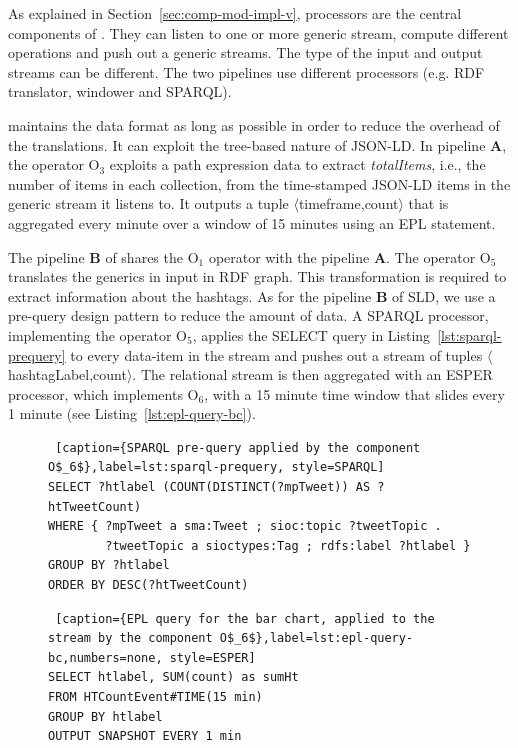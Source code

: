 {As explained in Section~\ref{sec:comp-mod-impl-v}, processors are the central components of \sti{}. They can listen to one or more generic stream, compute different operations and push out a generic streams. The type of the input and output streams can be different. The two pipelines use different processors (e.g. RDF translator, windower and SPARQL).

\sti{} maintains the data format as long as possible in order to reduce the overhead of the translations. It can exploit the tree-based nature of JSON-LD. In pipeline \textbf{A}, the operator O$_3$ exploits a path expression data to extract \textit{totalItems}, i.e., the number of items in each collection, from the time-stamped JSON-LD items in the generic stream it listens to. It outputs a tuple $\langle$timeframe,count$\rangle$ that is aggregated every minute over a window of 15 minutes using an EPL statement.

The pipeline \textbf{B} of \sti{} shares the O$_1$ operator with the pipeline \textbf{A}.
The operator O$_5$ translates the generics in input in RDF graph. This transformation is required to extract information about the hashtags. As for the pipeline \textbf{B} of SLD, we use a pre-query design pattern to reduce the amount of data. A SPARQL processor, implementing the operator O$_5$, applies the SELECT query in Listing~\ref{lst:sparql-prequery} to every data-item in the stream and pushes out a stream of tuples $\langle$hashtagLabel,count$\rangle$. The relational stream is then aggregated with an ESPER processor, which implements O$_6$, with a 15 minute time window that slides every 1 minute (see Listing~\ref{lst:epl-query-bc}). 

\begin{figure}[ht]
\begin{minipage}{0.95\linewidth}
\centering
\begin{lstlisting} [caption={SPARQL pre-query applied by the component O$_6$},label=lst:sparql-prequery, style=SPARQL]
SELECT ?htlabel (COUNT(DISTINCT(?mpTweet)) AS ?htTweetCount) 
WHERE { ?mpTweet a sma:Tweet ; sioc:topic ?tweetTopic . 
        ?tweetTopic a sioctypes:Tag ; rdfs:label ?htlabel } 
GROUP BY ?htlabel 
ORDER BY DESC(?htTweetCount) 
\end{lstlisting}
\end{minipage}
\end{figure}

\begin{figure}[ht]
\begin{minipage}{0.95\linewidth}
\begin{lstlisting} [caption={EPL query for the bar chart, applied to the stream by the component O$_6$},label=lst:epl-query-bc,numbers=none, style=ESPER]
SELECT htlabel, SUM(count) as sumHt 
FROM HTCountEvent#TIME(15 min) 
GROUP BY htlabel 
OUTPUT SNAPSHOT EVERY 1 min 
\end{lstlisting}
\end{minipage}
\end{figure}

}

